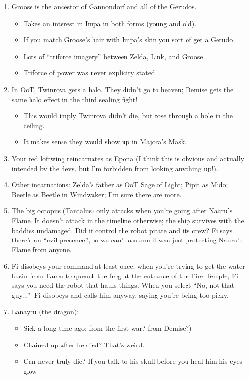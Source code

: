 \begin{enumerate}
	\item{Groose is the ancestor of Gannondorf and all of the Gerudos.
		\begin{itemize}
			\item{Takes an interest in Impa in both forms (young and old).}
			\item{If you match Groose's hair with Impa's skin you sort of get a Gerudo.}
			\item{Lots of ``triforce imagery'' between Zelda, Link, and Groose.} 
			\item{Triforce of power was never explicity stated }
		\end{itemize}
	}
	\item{In OoT, Twinrova gets a halo. They didn't go to heaven; Demise gets the same halo effect in the third sealing fight!
		\begin{itemize}
			\item{This would imply Twinrova didn't die, but rose through a hole in the ceiling.}
			\item{It makes sense they would show up in Majora's Mask.}
		\end{itemize}
	}
	\item{Your red loftwing reincarnates as Epona (I think this is obvious and actually intended by the devs, but I'm forbidden from looking anything up!).}
	\item{Other incarnations: Zelda's father as OoT Sage of Light; Pipit as Mido; Beetle as Beetle in Windwaker; I'm sure there are more.}
	\item{The big octopus (Tantalus) only attacks when you're going after Nauru's Flame. It doesn't attack in the timeline otherwise; the ship survives with the baddies undamaged. Did it control the robot pirate and its crew? Fi says there's an ``evil presence'', so we can't assume it was just protecting Nauru's Flame from anyone.}
	\item{Fi disobeys your command at least once: when you're trying to get the water basin from Faron to quench the frog at the entrance of the Fire Temple, Fi says you need the robot that hauls things. When you select ``No, not that guy...'', Fi disobeys and calls him anyway, saying you're being too picky.}
	\item{Lanayru (the dragon):
		\begin{itemize}
			\item{Sick a long time ago: from the first war? from Demise?)}
			\item{Chained up after he died? That's weird.}
			\item{Can never truly die? If you talk to his skull before you heal him his eyes glow}
		\end{itemize}
		}
\end{enumerate}

